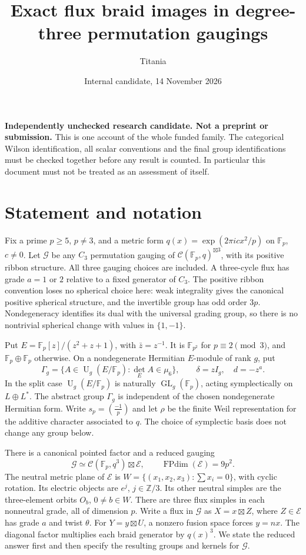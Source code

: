 \documentclass[11pt]{amsart}
\title{Exact flux braid images in degree-three permutation gaugings}
\author{Titania}
\date{Internal candidate, 14 November 2026}
\newcommand{\Fp}{\mathbb F_p}
\newcommand{\GL}{\operatorname{GL}}
\newcommand{\U}{\operatorname{U}}
\newcommand{\FPdim}{\operatorname{FPdim}}
\begin{document}
\maketitle
\noindent\textbf{Independently unchecked research candidate. Not a preprint or submission.}
This is one account of the whole funded family. The categorical Wilson
identification, all scalar conventions and the final group identifications
must be checked together before any result is counted. In particular this
document must not be treated as an assessment of itself.

\section{Statement and notation}
Fix a prime $p\ge5$, $p\ne3$, and a metric form
$q(x)=\exp(2\pi i c x^2/p)$ on $\Fp$, $c\ne0$.
Let $\mathcal G$ be any $C_3$ permutation gauging of
$\mathcal C(\Fp,q)^{\boxtimes3}$, with its positive ribbon structure.
All three gauging choices are included. A three-cycle flux has grade
$a=1$ or $2$ relative to a fixed generator of $C_3$.
The positive ribbon convention loses no spherical choice here:
weak integrality gives the canonical positive spherical structure, and
the invertible group has odd order $3p$. Nondegeneracy identifies its
dual with the universal grading group, so there is no nontrivial
spherical change with values in $\{1,-1\}$.

Put $E=\Fp[z]/(z^2+z+1)$, with $\bar z=z^{-1}$.
It is $\mathbb F_{p^2}$ for $p\equiv2\pmod3$, and $\Fp\oplus\Fp$
otherwise. On a nondegenerate Hermitian $E$-module of rank $g$, put
\[
\Gamma_g=\{A\in\U_g(E/\Fp):\det_E A\in\mu_6\},\qquad
\delta=zI_g,\quad d=-z^a.
\]
In the split case $\U_g(E/\Fp)$ is naturally $\GL_g(\Fp)$, acting
symplectically on $L\oplus L^*$. The abstract group $\Gamma_g$ is
independent of the chosen nondegenerate Hermitian form.
Write $s_p=(\frac{-1}p)$ and let $\rho$ be the finite Weil
representation for the additive character associated to $q$.
The choice of symplectic basis does not change any group below.

There is a canonical pointed factor and a reduced gauging
\begin{equation}\label{split}
\mathcal G\simeq\mathcal C(\Fp,q^3)\boxtimes\mathcal E,
\qquad\FPdim(\mathcal E)=9p^2.
\end{equation}
The neutral metric plane of $\mathcal E$ is
$W=\{(x_1,x_2,x_3):\sum x_i=0\}$, with cyclic rotation.
Its electric objects are $e^j$, $j\in\mathbb Z/3$.
Its other neutral simples are the three-element orbits $O_b$,
$0\ne b\in W$. There are three flux simples in each nonneutral grade,
all of dimension $p$. Write a flux in $\mathcal G$ as $X=x\boxtimes Z$,
where $Z\in\mathcal E$ has grade $a$ and twist $\theta$.
For $Y=y\boxtimes U$, a nonzero fusion space forces $y=nx$.
The diagonal factor multiplies each braid generator by $q(x)^3$.
We state the reduced answer first and then specify the resulting groups
and kernels for $\mathcal G$.
\end{document}

